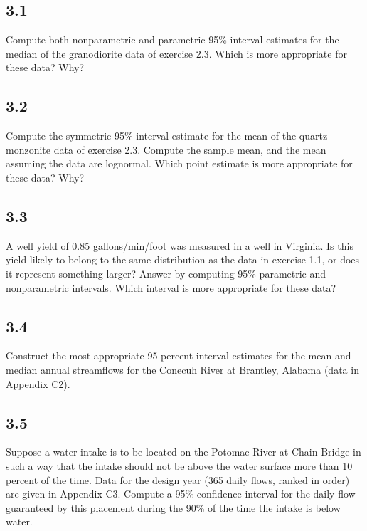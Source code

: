 \documentclass[]{book}
\begin{document}
\hypertarget{section-7}{%
\subsection*{3.1}\label{section-7}}

Compute both nonparametric and parametric 95\% interval estimates for the median of the granodiorite data of exercise 2.3. Which is more appropriate for these data? Why?

\hypertarget{section-8}{%
\subsection*{3.2}\label{section-8}}

Compute the symmetric 95\% interval estimate for the mean of the quartz monzonite data of exercise 2.3. Compute the sample mean, and the mean assuming the data are lognormal. Which point estimate is more appropriate for these data? Why?

\hypertarget{section-9}{%
\subsection*{3.3}\label{section-9}}

A well yield of 0.85 gallons/min/foot was measured in a well in Virginia. Is this yield likely to belong to the same distribution as the data in exercise 1.1, or does it represent something larger? Answer by computing 95\% parametric and nonparametric intervals. Which interval is more appropriate for these data?

\hypertarget{section-10}{%
\subsection*{3.4}\label{section-10}}

Construct the most appropriate 95 percent interval estimates for the mean and median annual streamflows for the Conecuh River at Brantley, Alabama (data in Appendix C2).

\hypertarget{section-11}{%
\subsection*{3.5}\label{section-11}}

Suppose a water intake is to be located on the Potomac River at Chain Bridge in such a way that the intake should not be above the water surface more than 10 percent of the time. Data for the design year (365 daily flows, ranked in order) are given in Appendix C3. Compute a 95\% confidence interval for the daily flow guaranteed by this placement during the 90\% of the time the intake is below water.


\end{document}
